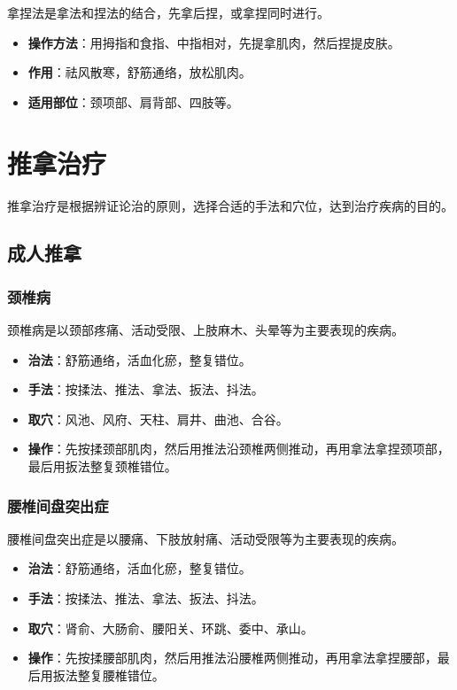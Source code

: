 \documentclass[12pt,UTF8]{ctexbook}
\begin{document}
拿捏法是拿法和捏法的结合，先拿后捏，或拿捏同时进行。

\begin{itemize}
\item \textbf{操作方法}：用拇指和食指、中指相对，先提拿肌肉，然后捏提皮肤。
\item \textbf{作用}：祛风散寒，舒筋通络，放松肌肉。
\item \textbf{适用部位}：颈项部、肩背部、四肢等。
\end{itemize}

\section{推拿治疗}

推拿治疗是根据辨证论治的原则，选择合适的手法和穴位，达到治疗疾病的目的。

\subsection{成人推拿}

\subsubsection{颈椎病}

颈椎病是以颈部疼痛、活动受限、上肢麻木、头晕等为主要表现的疾病。

\begin{itemize}
\item \textbf{治法}：舒筋通络，活血化瘀，整复错位。
\item \textbf{手法}：按揉法、推法、拿法、扳法、抖法。
\item \textbf{取穴}：风池、风府、天柱、肩井、曲池、合谷。
\item \textbf{操作}：先按揉颈部肌肉，然后用推法沿颈椎两侧推动，再用拿法拿捏颈项部，最后用扳法整复颈椎错位。
\end{itemize}

\subsubsection{腰椎间盘突出症}

腰椎间盘突出症是以腰痛、下肢放射痛、活动受限等为主要表现的疾病。

\begin{itemize}
\item \textbf{治法}：舒筋通络，活血化瘀，整复错位。
\item \textbf{手法}：按揉法、推法、拿法、扳法、抖法。
\item \textbf{取穴}：肾俞、大肠俞、腰阳关、环跳、委中、承山。
\item \textbf{操作}：先按揉腰部肌肉，然后用推法沿腰椎两侧推动，再用拿法拿捏腰部，最后用扳法整复腰椎错位。
\end{itemize}
\end{document}
